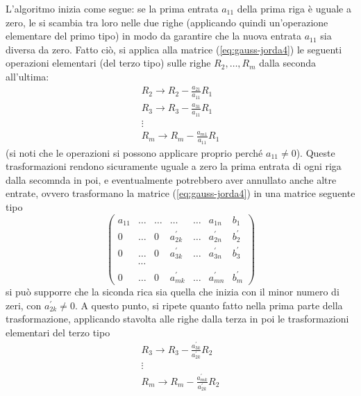 L'algoritmo inizia come segue: se la prima entrata $a_{11}$ della prima
riga è uguale a zero, le si scambia tra loro nelle due righe (applicando
quindi un'operazione elementare del primo tipo) in modo da garantire che
la nuova entrata $a_{11}$ sia diversa da zero. Fatto ciò, si applica alla
matrice (\ref{eq:gauss-jorda4}) le seguenti operazioni elementari (del
terzo tipo) sulle righe $R_2,\dots,R_m$ dalla seconda all'ultima:
\begin{equation*}
  \begin{matrix}
    R_2\to R_2-\frac{a_{21}}{a_{11}}R_1\\
    R_{3}\to R_3-\frac{a_{31}}{a_{11}}R_1\\
    \vdots\\
    R_{m}\to R_m-\frac{a_{m1}}{a_{11}}R_1
  \end{matrix}
\end{equation*}
(si noti che le operazioni si possono applicare proprio perché
$a_{11}\neq 0$). Queste trasformazioni rendono sicuramente uguale a zero
la prima entrata di ogni riga dalla secomnda in poi, e eventualmente
potrebbero aver annullato anche altre entrate, ovvero trasformano la
matrice (\ref{eq:gauss-jorda4}) in una matrice seguente tipo
\begin{equation}
  \label{eq:gauss-jorda5}
  \begin{pmatrix}
    a_{11} & \dots & \dots & \dots & \dots & a_{1n} & b_1\\
    0 & \dots & 0 & a_{2k}^\prime & \dots & a_{2n}^\prime & b_2^\prime\\
    0 & \dots & 0 & a_{3k}^\prime & \dots & a_{3n}^\prime & b_3^\prime\\
           & \cdots\\
    0 & \dots & 0 & a_{mk}^\prime & \dots & a_{mn}^\prime & b_m^\prime
  \end{pmatrix}
\end{equation}
si può supporre che la siconda rica sia quella che inizia con il minor
numero di zeri, con $a_{2k}^\prime\neq 0$. A questo punto, si ripete quanto
fatto nella prima parte della trasformazione, applicando stavolta alle
righe dalla terza in poi le trasformazioni elementari del terzo tipo
\begin{equation*}
  \begin{matrix}
    R_3\to R_3-\frac{a^\prime_{3k}}{a_{2k}^\prime}R_2\\
    \vdots\\
    R_m\to R_m-\frac{a^\prime_{mk}}{a_{2k}^\prime}R_2\\
  \end{matrix}
\end{equation*}
